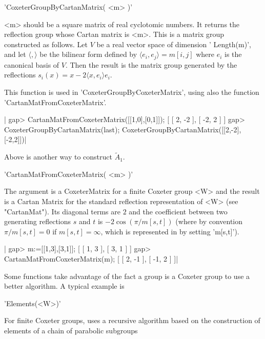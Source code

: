 
'CoxeterGroupByCartanMatrix( <m> )'

<m>  should be a square  matrix of real cyclotomic  numbers. It returns the
reflection  group  whose  Cartan  matrix  is  <m>.  This  is a matrix group
constructed  as follows.  Let $V$  be a  real vector  space of  dimension '
Length(m)',  and  let  $\langle,\rangle$  be  the  bilinear form defined by
$\langle e_i, e_j\rangle=m[i,j]$ where $e_i$ is the canonical basis of $V$.
Then   the  result  is  the  matrix  group  generated  by  the  reflections
$s_i(x)=x-2\langle x, e_i\rangle e_i$.

This  function  is  used  in  'CoxeterGroupByCoxeterMatrix', using also the
function 'CartanMatFromCoxeterMatrix'.

|    gap> CartanMatFromCoxeterMatrix([[1,0],[0,1]]);
    [ [ 2, -2 ], [ -2, 2 ] ]
    gap> CoxeterGroupByCartanMatrix(last);
    CoxeterGroupByCartanMatrix([[2,-2],[-2,2]])|

Above is another way to construct $\tilde A_1$.


'CartanMatFromCoxeterMatrix( <m> )'

The  argument is  a CoxeterMatrix  for a  finite Coxeter  group <W> and the
result is a Cartan Matrix for the standard reflection representation of <W>
(see  "CartanMat"). Its diagonal terms are  $2$ and the coefficient between
two  generating reflections $s$  and $t$ is  $-2\cos(\pi/m[s,t])$ (where by
convention  $\pi/m[s,t]=0$  if  $m[s,t]=\infty$,  which  is  represented in
{\CHEVIE} by setting 'm[s,t]').

|    gap> m:=[[1,3],[3,1]];
    [ [ 1, 3 ], [ 3, 1 ] ]
    gap> CartanMatFromCoxeterMatrix(m);
    [ [ 2, -1 ], [ -1, 2 ] ]|


Some functions take advantage of the fact a group is a Coxeter group to
use a better algorithm. A typical example is\:

'Elements(<W>)'

For  finite Coxeter  groups, uses  a  recursive algorithm  based on  the
construction of elements of a chain of parabolic subgroups

